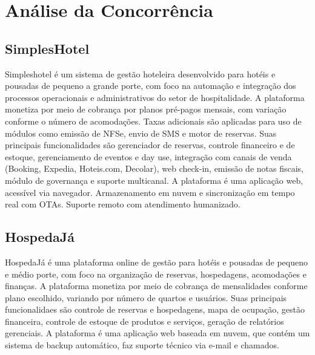 \documentclass[
	12pt,				%
	openany,			%
	twoside,			%
	a4paper,			%
	english,			%
	french,				%
	spanish,			%
	brazil				%
	]{abntex2}
\begin{document}
\section{Análise da Concorrência}
\subsection{SimplesHotel}
Simpleshotel é um sistema de gestão hoteleira desenvolvido para hotéis e pousadas de pequeno a grande porte, com foco na automação e integração dos processos operacionais e administrativos do setor de hospitalidade.
A plataforma monetiza por meio de cobrança por planos pré-pagos mensais, com variação conforme o número de acomodações. Taxas adicionais são aplicadas para uso de módulos como emissão de NFSe, envio de SMS e motor de reservas.
Suas principais funcionalidades são gerenciador de reservas, controle financeiro e de estoque, gerenciamento de eventos e day use, integração com canais de venda (Booking, Expedia, Hoteis.com, Decolar), web check-in, emissão de notas fiscais, módulo de governança e suporte multicanal.
A plataforma é uma aplicação web, acessível via navegador. Armazenamento em nuvem e sincronização em tempo real com OTAs. Suporte remoto com atendimento humanizado.
\subsection{HospedaJá}
HospedaJá é uma plataforma online de gestão para hotéis e pousadas de pequeno e médio porte, com foco na organização de reservas, hospedagens, acomodações e finanças.
A plataforma monetiza por meio de cobrança de mensalidades conforme plano escolhido, variando por número de quartos e usuários.
Suas principais funcionalidaes são controle de reservas e hospedagens, mapa de ocupação, gestão financeira, controle de estoque de produtos e serviços, geração de relatórios gerenciais.
A plataforma é uma aplicação web baseada em nuvem, que contém um sistema de backup automático, faz suporte técnico via e-mail e chamados.
\end{document}
